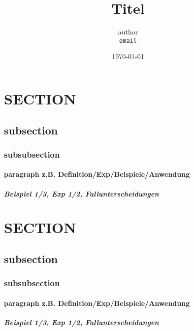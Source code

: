 \documentclass[11pt]{article}
\begin{document}
	\title{Titel}
		\author
		{
			author\\
			{\small 	\texttt{email}}
		}
		\date{\today}
	\maketitle
	\tableofcontents
	\setcounter{section}{14} %
	
	\newpage
	
\section{SECTION }	
	\subsection{ subsection }	
		\subsubsection{ subsubsection }
			\paragraph{paragraph z.B. Definition/Exp/Beispiele/Anwendung }
				\subparagraph{Beispiel 1/3, Exp 1/2, Fallunterscheidungen}	
				
\newpage	
	

{}
\section*{SECTION}
	\subsection*{ subsection }
		\subsubsection*{ subsubsection }
			\paragraph{paragraph z.B. Definition/Exp/Beispiele/Anwendung }
				\subparagraph{Beispiel 1/3, Exp 1/2, Fallunterscheidungen}	

\end{document}
